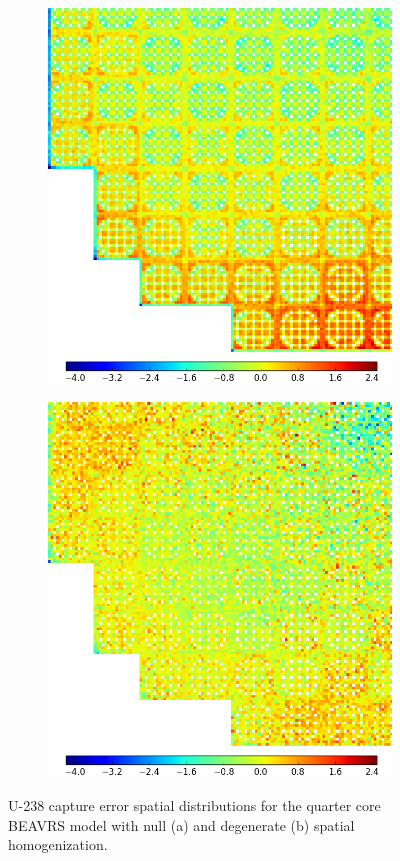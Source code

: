\begin{figure}[h!]
\centering
\begin{subfigure}{0.9\textwidth}
  \centering
  \includegraphics[width=0.65\linewidth]{figures/results/spatial/full-core/capt-err-null}
  \caption{}
  \label{fig:chap11-full-core-capt-err-null}
\end{subfigure}
\begin{subfigure}{0.9\textwidth}
  \centering
\includegraphics[width=0.65\linewidth]{figures/results/spatial/full-core/capt-err-degenerate}
  \caption{}
  \label{fig:chap11-full-core-capt-err-degenerate}
\end{subfigure}
\caption[U-238 capture rate errors for \ac{BEAVRS}]{U-238 capture error spatial distributions for the quarter core \ac{BEAVRS} model with null (a) and degenerate (b) spatial homogenization.}
\label{fig:chap11-full-core-capt-err-a}
\end{figure}

